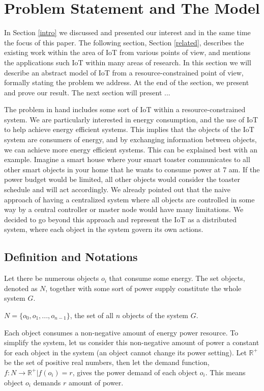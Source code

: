 \documentclass[../main/Self-Stabilization.tex]{subfiles}
\begin{document}
\section{Problem Statement and The Model}\label{problem}
In Section \ref{intro} we discussed and presented our interest and in the same time the focus of this paper. The following section, Section \ref{related}, describes the existing work within the area of IoT from various points of view, and mentions the applications such IoT within many areas of research. In this section we will describe an abstract model of IoT from a resource-constrained point of view, formally stating the problem we address. At the end of the section, we present and prove our result. The next section will present ...

The problem in hand includes some sort of IoT within a resource-constrained system. We are particularly interested in energy consumption, and the use of IoT to help achieve energy efficient systems. This implies that the objects of the IoT system are consumers of energy, and by exchanging information between objects, we can achieve more energy efficient systems. This can be explained best with an example. Imagine a smart house where your smart toaster communicates to all other smart objects in your home that he wants to consume power at 7 am. If the power budget would be limited, all other objects would consider the toaster schedule and will act accordingly. We already pointed out that the naive approach of having a centralized system where all objects are controlled in some way by a central controller or master node would have many limitations. We decided to go beyond this approach and represent the IoT as a distributed system, where each object in the system govern its own actions.

\subsection{Definition and Notations}
Let there be numerous objects $o_{i}$ that consume some energy. The set objects, denoted as $N$, together with some sort of power supply constitute the whole system $G$.
 \begin{center}
    $N=\{o_{0}, o_{1}, ...,o_{n-1}\}$, the set of all $n$ objects of the system $G$.
 \end{center}
Each object consumes a non-negative amount of energy power resource. To simplify the system, let us consider this non-negative amount of power a constant for each object in the system (an object cannot change its power setting). Let $\mathbb{R^+}$ be the set of positive real numbers, then let the demand function, $f:N\rightarrow\mathbb{R^+} | f(o_{i})=r$, gives the power demand of each object $o_{i}$. This means object $o_{i}$ demands $r$ amount of power.
\end{document}
